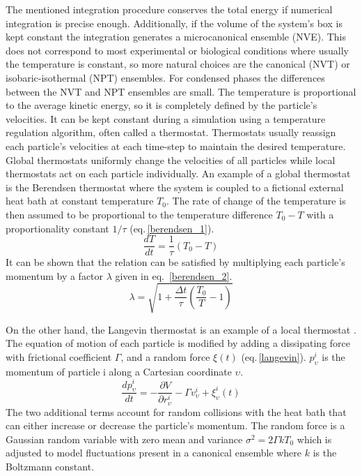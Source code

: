 The mentioned integration procedure conserves the total energy if numerical integration is precise enough. Additionally, if the volume of the system's box is kept constant the integration generates a microcanonical ensemble (NVE). This does not correspond to most experimental or biological conditions where usually the temperature is constant, so more natural choices are the canonical (NVT) or isobaric-isothermal (NPT) ensembles. For condensed phases the differences between the NVT and NPT ensembles are small. The temperature is proportional to the average kinetic energy, so it is completely defined by the particle's velocities. It can be kept constant during a simulation using a temperature regulation algorithm, often called a thermostat. Thermostats usually reassign each particle's velocities at each time-step to maintain the desired temperature. Global thermostats uniformly change the velocities of all particles while local thermostats act on each particle individually. An example of a global thermostat is the Berendsen thermostat \cite{Berendsen1984} where the system is coupled to a fictional external heat bath at constant temperature $T_0$. The rate of change of the temperature is then assumed to be proportional to the temperature difference $T_0 - T$ with a proportionality constant $1/\tau$ (eq.\,\ref{berendsen_1}).
\begin{equation} \label{berendsen_1}
    \frac{dT}{dt} = \frac{1}{\tau} ( T_0 - T )
\end{equation}
It can be shown that the relation can be satisfied by multiplying each particle's momentum by a factor $\lambda$ given in eq.~\ref{berendsen_2}.
\begin{equation} \label{berendsen_2}
    \lambda = \sqrt{1 + \frac{\Delta t}{\tau} \left(\frac{T_0}{T} - 1 \right)}
\end{equation}

On the other hand, the Langevin thermostat is an example of a local thermostat \cite{Grest1986, Murtola2009}. The equation of motion of each particle is modified by adding a dissipating force with frictional coefficient $\Gamma$, and a random force $\xi(t)$ (eq.\,\ref{langevin}). $p^i_{\upsilon}$ is the momentum of particle i along a Cartesian coordinate $\upsilon$. 
\begin{equation} \label{langevin}
    \frac{d p^i_{\upsilon}}{dt} = - \frac{\partial V}{\partial r^i_{\upsilon}} - \Gamma v^i_{\upsilon} + \xi_{\upsilon}^{i}(t)
\end{equation}
The two additional terms account for random collisions with the heat bath that can either increase or decrease the particle's momentum. The random force is a Gaussian random variable with zero mean and variance $\sigma^2 = 2 \Gamma k T_0$ which is adjusted to model fluctuations present in a canonical ensemble where $k$ is the Boltzmann constant.

